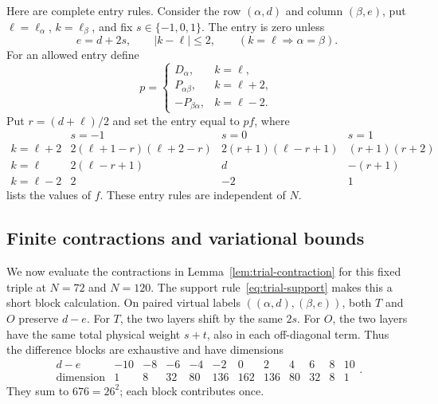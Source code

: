 Here are complete entry rules. Consider the row $(\alpha,d)$ and column
$(\beta,e)$, put $\ell=\ell_\alpha$, $k=\ell_\beta$, and fix
$s\in\{-1,0,1\}$. The entry is zero unless
\begin{equation}\label{eq:trial-support}
 e=d+2s,\qquad |k-\ell|\le2,\qquad
 (k=\ell\Longrightarrow\alpha=\beta).
\end{equation}
For an allowed entry define
\[
 p=\begin{cases}
 D_\alpha,& k=\ell,\\
 P_{\alpha\beta},& k=\ell+2,\\
 -P_{\beta\alpha},& k=\ell-2.
 \end{cases}
\]
Put $r=(d+\ell)/2$ and set the entry equal to $p f$,
where
\begin{equation}\label{eq:trial-entry}
\begin{array}{c|ccc}
 &s=-1&s=0&s=1\\ \hline
k=\ell+2&
 2(\ell+1-r)(\ell+2-r)&2(r+1)(\ell-r+1)&(r+1)(r+2)\\
k=\ell&
 2(\ell-r+1)&d&-(r+1)\\
k=\ell-2&2&-2&1
\end{array}
\end{equation}
lists the values of $f$.
These entry rules are independent of $N$.

\subsection{Finite contractions and variational bounds}

We now evaluate the contractions in Lemma~\ref{lem:trial-contraction}
for this fixed triple at $N=72$ and $N=120$.
The support rule~\eqref{eq:trial-support}
makes this a short block calculation. On paired virtual labels
$((\alpha,d),(\beta,e))$, both $T$ and $O$ preserve $d-e$.
For $T$, the two layers shift by the same $2s$.
For $O$, the two layers have the same total physical weight $s+t$,
also in each off-diagonal term.
Thus the difference blocks are exhaustive and have dimensions
\begin{equation}\label{eq:trial-blocks}
\begin{array}{c|rrrrrrrrrrr}
d-e&-10&-8&-6&-4&-2&0&2&4&6&8&10\\ \hline
\text{dimension}&1&8&32&80&136&162&136&80&32&8&1
\end{array}.
\end{equation}
They sum to $676=26^2$; each block contributes once.

